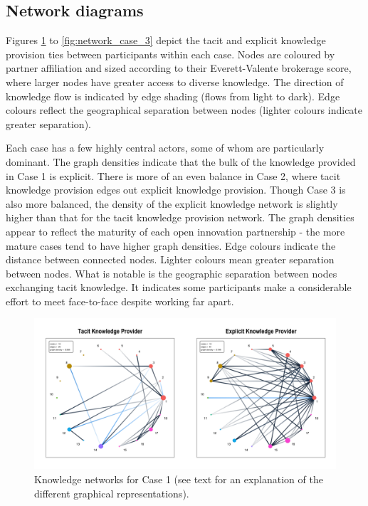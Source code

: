 \subsection{Network diagrams}

Figures \ref{fig:network_case_1} to \ref{fig:network_case_3} depict the tacit and explicit knowledge provision ties between participants within each case. Nodes are coloured by partner affiliation and sized according to their Everett-Valente brokerage score, where larger nodes have greater access to diverse knowledge. The direction of knowledge flow is indicated by edge shading (flows from light to dark). Edge colours reflect the geographical separation between nodes (lighter colours indicate greater separation). \medskip

Each case has a few highly central actors, some of whom are particularly dominant. The graph densities indicate that the bulk of the knowledge provided in Case 1 is explicit. There is more of an even balance in Case 2, where tacit knowledge provision edges out explicit knowledge provision. Though Case 3 is also more balanced, the density of the explicit knowledge network is slightly higher than that for the tacit knowledge provision network. The graph densities appear to reflect the maturity of each open innovation partnership - the more mature cases tend to have higher graph densities. Edge colours indicate the distance between connected nodes. Lighter colours mean greater separation between nodes. What is notable is the geographic separation between nodes exchanging tacit knowledge. It indicates some participants make a considerable effort to meet face-to-face despite working far apart. \medskip

\begin{figure}
\includegraphics[width=1\linewidth]{Images/networks_case_1.png}
\caption[Knowledge networks for Case 1]{Knowledge networks for Case 1 (see text for an explanation of the different graphical representations).}
\label{fig:network_case_1} 
\end{figure}

